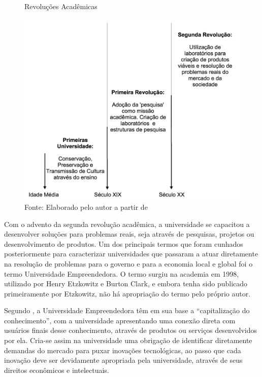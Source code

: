 \begin{figure}[h]
\caption{Revoluções Acadêmicas}
\centerline{\includegraphics[scale=0.5]{img/academic_revolutions}}
\label{fig:academic_revolutions}
\caption* {Fonte: Elaborado pelo autor a partir de }
\end{figure}

Com o advento da segunda revolução acadêmica, a universidade se capacitou a desenvolver soluções para problemas reais, seja através de pesquisas, projetos ou desenvolvimento de produtos. Um dos principais termos que foram cunhados posteriormente para caracterizar universidades que passaram a atuar diretamente na resolução de problemas para o governo e para a economia local e global foi o termo Universidade Empreendedora. O termo surgiu na academia em 1998, utilizado por Henry Etzkowitz e Burton Clark, e embora tenha sido publicado primeiramente por Etzkowitz, não há apropriação do termo pelo próprio autor.

Segundo , a Universidade Empreendedora têm em sua base a \enquote{capitalização do conhecimento}, com a universidade apresentando uma conexão direta com usuários finais desse conhecimento, através de produtos ou serviços desenvolvidos por ela. Cria-se assim na universidade uma obrigação de identificar diretamente demandas do mercado para puxar inovações tecnológicas, ao passo que cada inovação deve ser devidamente apropriada pela universidade, através de seus direitos econômicos e intelectuais.

